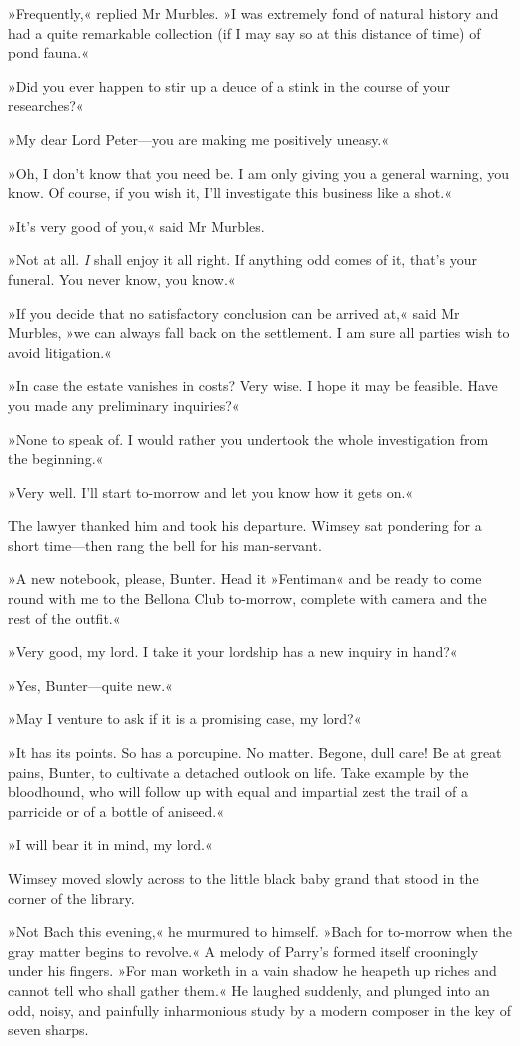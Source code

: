 »Frequently,« replied Mr Murbles. »I was extremely fond of natural history and had a quite remarkable collection (if I may say so at this distance of time) of pond fauna.«

»Did you ever happen to stir up a deuce of a stink in the course of your researches?«

»My dear Lord Peter—you are making me positively uneasy.«

»Oh, I don't know that you need be. I am only giving you a general warning, you know. Of course, if you wish it, I'll investigate this business like a shot.«

»It's very good of you,« said Mr Murbles.

»Not at all. \textit{I} shall enjoy it all right. If anything odd comes of it, that's your funeral. You never know, you know.«

»If you decide that no satisfactory conclusion can be arrived at,« said Mr Murbles, »we can always fall back on the settlement. I am sure all parties wish to avoid litigation.«

»In case the estate vanishes in costs? Very wise. I hope it may be feasible. Have you made any preliminary inquiries?«

»None to speak of. I would rather you undertook the whole investigation from the beginning.«

»Very well. I'll start to-morrow and let you know how it gets on.«

The lawyer thanked him and took his departure. Wimsey sat pondering for a short time—then rang the bell for his man-servant.

»A new notebook, please, Bunter. Head it »Fentiman« and be ready to come round with me to the Bellona Club to-morrow, complete with camera and the rest of the outfit.«

»Very good, my lord. I take it your lordship has a new inquiry in hand?«

»Yes, Bunter—quite new.«

»May I venture to ask if it is a promising case, my lord?«

»It has its points. So has a porcupine. No matter. Begone, dull care! Be at great pains, Bunter, to cultivate a detached outlook on life. Take example by the bloodhound, who will follow up with equal and impartial zest the trail of a parricide or of a bottle of aniseed.«

»I will bear it in mind, my lord.«

Wimsey moved slowly across to the little black baby grand that stood in the corner of the library.

»Not Bach this evening,« he murmured to himself. »Bach for to-morrow when the gray matter begins to revolve.« A melody of Parry's formed itself crooningly under his fingers. »For man worketh in a vain shadow \textellipsis  he heapeth up riches and cannot tell who shall gather them.« He laughed suddenly, and plunged into an odd, noisy, and painfully inharmonious study by a modern composer in the key of seven sharps.